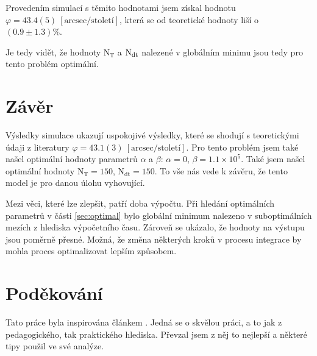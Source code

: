 \documentclass[a4paper,11pt,twocolumn]{article}
\begin{document}
            Provedením simulací s těmito hodnotami jsem získal hodnotu $\varphi = 43.4(5) ~[\text{arcsec/století}]$, která se od teoretické hodnoty liší o $(0.9 \pm 1.3)\%$. 
            
            Je tedy vidět, že hodnoty $\text{N}_{\text{T}}$ a $\text{N}_{\text{\text{dt}}}$ nalezené v globálním minimu jsou tedy pro tento problém optimální.

    \section{Závěr}
        Výsledky simulace ukazují uspokojivé výsledky, které se shodují s teoretickými údaji z literatury $\varphi = 43.1(3) ~[\text{arcsec/století}]$. Pro tento problém jsem také našel optimální hodnoty parametrů $\alpha$ a $\beta$: $\alpha = 0$, $\beta = 1.1 \times 10^5$. Také jsem našel optimální hodnoty $\text{N}_{\text{T}} = 150$, $\text{N}_{\text{dt}} = 150$. To vše nás vede k závěru, že tento model je pro danou úlohu vyhovující. 
        
        Mezi věci, které lze zlepšit, patří doba výpočtu. Při hledání optimálních parametrů v části \ref{sec:optimal} bylo globální minimum nalezeno v suboptimálních mezích z hlediska výpočetního času. Zároveň se ukázalo, že hodnoty na výstupu jsou poměrně přesné. Možná, že změna některých kroků v procesu integrace by mohla proces optimalizovat lepším způsobem. 

    
    

    \section*{Poděkování}
        Tato práce byla inspirována článkem \citet{korber2018}. Jedná se o skvělou práci, a to jak z pedagogického, tak praktického hlediska. Převzal jsem z něj to nejlepší a některé tipy použil ve své analýze. 
\end{document}
